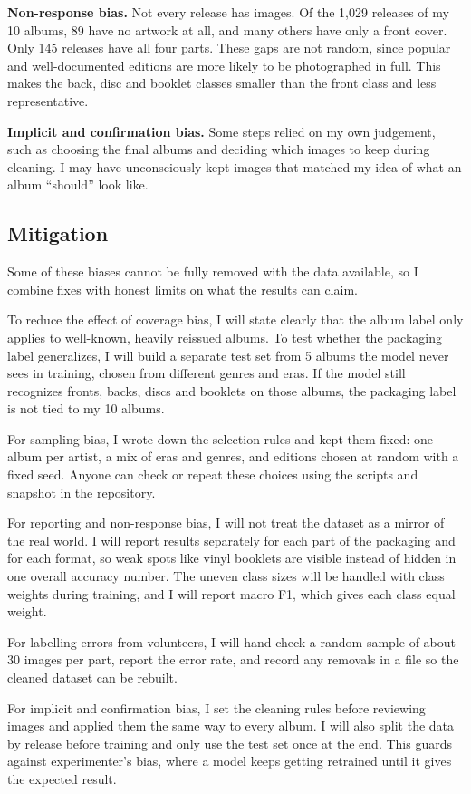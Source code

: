 \documentclass[10pt,a4paper,twocolumn]{article}
\begin{document}
\textbf{Non-response bias.} Not every release has images. Of the 1,029 releases of my 10 albums, 89 have no artwork at all, and many others have only a front cover. Only 145 releases have all four parts. These gaps are not random, since popular and well-documented editions are more likely to be photographed in full. This makes the back, disc and booklet classes smaller than the front class and less representative.

\textbf{Implicit and confirmation bias.} Some steps relied on my own judgement, such as choosing the final albums and deciding which images to keep during cleaning. I may have unconsciously kept images that matched my idea of what an album ``should'' look like.

\subsection{Mitigation}
Some of these biases cannot be fully removed with the data available, so I combine fixes with honest limits on what the results can claim.

To reduce the effect of coverage bias, I will state clearly that the album label only applies to well-known, heavily reissued albums. To test whether the packaging label generalizes, I will build a separate test set from 5 albums the model never sees in training, chosen from different genres and eras. If the model still recognizes fronts, backs, discs and booklets on those albums, the packaging label is not tied to my 10 albums.

For sampling bias, I wrote down the selection rules and kept them fixed: one album per artist, a mix of eras and genres, and editions chosen at random with a fixed seed. Anyone can check or repeat these choices using the scripts and snapshot in the repository.

For reporting and non-response bias, I will not treat the dataset as a mirror of the real world. I will report results separately for each part of the packaging and for each format, so weak spots like vinyl booklets are visible instead of hidden in one overall accuracy number. The uneven class sizes will be handled with class weights during training, and I will report macro F1, which gives each class equal weight.

For labelling errors from volunteers, I will hand-check a random sample of about 30 images per part, report the error rate, and record any removals in a file so the cleaned dataset can be rebuilt.

For implicit and confirmation bias, I set the cleaning rules before reviewing images and applied them the same way to every album. I will also split the data by release before training and only use the test set once at the end. This guards against experimenter's bias, where a model keeps getting retrained until it gives the expected result.
\end{document}
